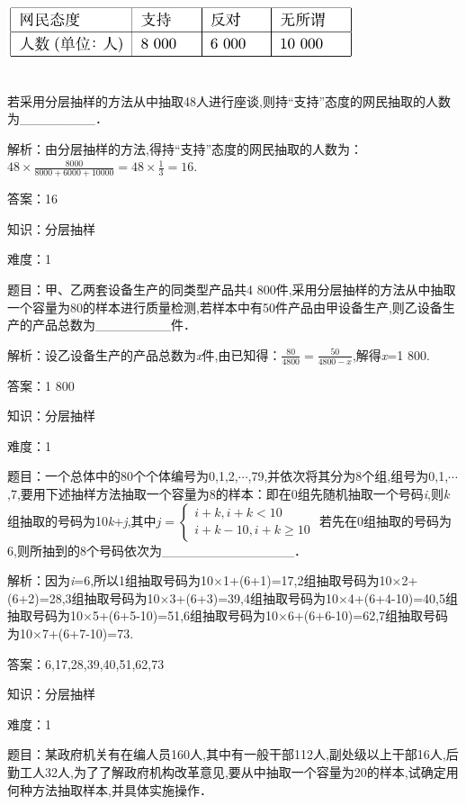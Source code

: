 \documentclass{article} %
\begin{document}
\includegraphics*[width=4in, height=1in, keepaspectratio=false]{image116}

若采用分层抽样的方法从中抽取48人进行座谈,则持``支持''态度的网民抽取的人数为\_\_\_\_\_\_\_\_．

解析：由分层抽样的方法,得持``支持''态度的网民抽取的人数为：$48\times\frac{8000}{8000+6000+10000}=48\times\frac{1}{3}=16$.

答案：16

知识：分层抽样

难度：1

题目：甲、乙两套设备生产的同类型产品共4 800件,采用分层抽样的方法从中抽取一个容量为80的样本进行质量检测,若样本中有50件产品由甲设备生产,则乙设备生产的产品总数为\_\_\_\_\_\_\_\_件．

解析：设乙设备生产的产品总数为\textit{x}件,由已知得：$\frac{80}{4800}=\frac{50}{4800-x}$,解得\textit{x}=1 800.

答案：1 800

知识：分层抽样

难度：1

题目：一个总体中的80个个体编号为0,1,2,$\cdots$,79,并依次将其分为8个组,组号为0,1,$\cdots$,7,要用下述抽样方法抽取一个容量为8的样本：即在0组先随机抽取一个号码\textit{i},则\textit{k}组抽取的号码为10\textit{k}+\textit{j},其中$j=
\left\{\begin{array}{l}
	i+k,i+k<10\\
	i+k-10,i+k\ge10
\end{array}\right.$
若先在0组抽取的号码为6,则所抽到的8个号码依次为\_\_\_\_\_\_\_\_\_\_\_\_\_\_．

解析：因为\textit{i}=6,所以1组抽取号码为10$\mathrm{\times}$1+(6+1)=17,2组抽取号码为10$\mathrm{\times}$2+(6+2)=28,3组抽取号码为10$\mathrm{\times}$3+(6+3)=39,4组抽取号码为10$\mathrm{\times}$4+(6+4-10)=40,5组抽取号码为10$\mathrm{\times}$5+(6+5-10)=51,6组抽取号码为10$\mathrm{\times}$6+(6+6-10)=62,7组抽取号码为10$\mathrm{\times}$7+(6+7-10)=73.

答案：6,17,28,39,40,51,62,73

知识：分层抽样

难度：1

题目：某政府机关有在编人员160人,其中有一般干部112人,副处级以上干部16人,后勤工人32人,为了了解政府机构改革意见,要从中抽取一个容量为20的样本,试确定用何种方法抽取样本,并具体实施操作．
\end{document}
